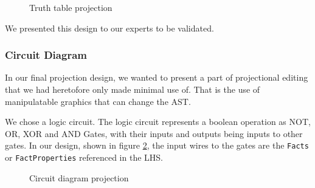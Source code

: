 \begin{figure}
    \centering
    \caption{Truth table projection}
    \label{fig:TruthTableProjection}
\end{figure}

We presented this design to our experts to be validated.

\subsubsection{Circuit Diagram}
In our final projection design, we wanted to present a part of projectional editing that we had heretofore only made minimal use of.
That is the use of manipulatable graphics that can change the AST.

We chose a logic circuit. 
The logic circuit represents a boolean operation as NOT, OR, XOR and AND Gates, with their inputs and outputs being inputs to other gates.
In our design, shown in figure \ref{fig:CircuitDiagramProjection}, the input wires to the gates are the \texttt{Facts} or \texttt{FactProperties} referenced in the LHS.

\begin{figure}
    \centering
    \caption{Circuit diagram projection}
    \label{fig:CircuitDiagramProjection}
\end{figure}

